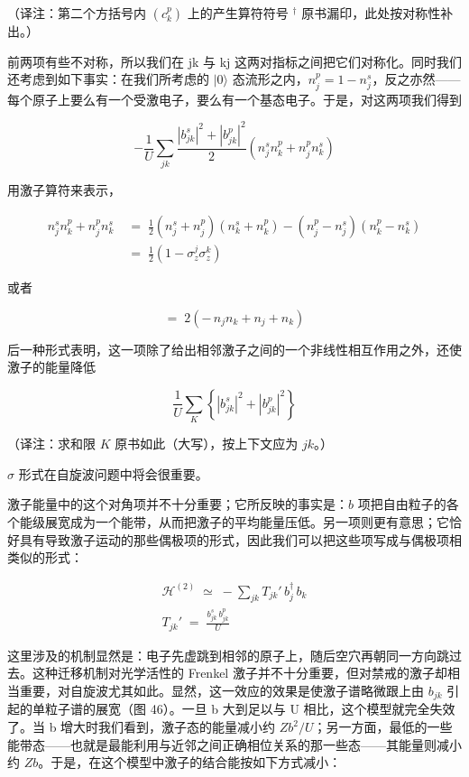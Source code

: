 （译注：第二个方括号内 $\left(c_k^{p}\right)$ 上的产生算符符号 $^{\dagger}$ 原书漏印，此处按对称性补出。）

前两项有些不对称，所以我们在 jk 与 kj 这两对指标之间把它们对称化。同时我们还考虑到如下事实：在我们所考虑的 $|0\rangle$ 态流形之内，$n_j^{p} = 1 - n_j^{s}$，反之亦然——每个原子上要么有一个受激电子，要么有一个基态电子。于是，对这两项我们得到

\begin{equation*}
-\frac{1}{U}\sum_{jk}\frac{|b_{jk}^{s}|^{2} + |b_{jk}^{p}|^{2}}{2}\left(n_j^{s}n_k^{p} + n_j^{p}n_k^{s}\right)
\end{equation*}

用激子算符来表示，

\begin{align*}
n_j^{s}n_k^{p} + n_j^{p}n_k^{s} \;&=\; \frac{1}{2}\left(n_j^{s} + n_j^{p}\right)\left(n_k^{s} + n_k^{p}\right) - \left(n_j^{p} - n_j^{s}\right)\left(n_k^{p} - n_k^{s}\right) \\
&=\; \frac{1}{2}\left(1 - \sigma_z^{j}\sigma_z^{k}\right)
\end{align*}

或者

\begin{equation*}
=\;2\left(-\,n_j n_k + n_j + n_k\right)
\end{equation*}

后一种形式表明，这一项除了给出相邻激子之间的一个非线性相互作用之外，还使激子的能量降低

\begin{equation*}
\frac{1}{U}\sum_{K}\left\{|b_{jk}^{s}|^{2} + |b_{jk}^{p}|^{2}\right\}
\end{equation*}

（译注：求和限 $K$ 原书如此（大写），按上下文应为 $jk$。）

$\sigma$ 形式在自旋波问题中将会很重要。

激子能量中的这个对角项并不十分重要；它所反映的事实是：$b$ 项把自由粒子的各个能级展宽成为一个能带，从而把激子的平均能量压低。另一项则更有意思；它恰好具有导致激子运动的那些偶极项的形式，因此我们可以把这些项写成与偶极项相类似的形式：

\begin{gather*}
\mathcal{H}^{(2)} \;\simeq\; -\sum_{jk} T_{jk}'\,b_j^{\dagger}\,b_k \\
T_{jk}' \;=\; \frac{b_{jk}^{s}\,b_{jk}^{p}}{U} \tag{22}
\end{gather*}

这里涉及的机制显然是：电子先虚跳到相邻的原子上，随后空穴再朝同一方向跳过去。这种迁移机制对光学活性的 Frenkel 激子并不十分重要，但对禁戒的激子却相当重要，对自旋波尤其如此。显然，这一效应的效果是使激子谱略微跟上由 $b_{jk}$ 引起的单粒子谱的展宽（图 46）。一旦 b 大到足以与 U 相比，这个模型就完全失效了。当 b 增大时我们看到，激子态的能量减小约 $Zb^{2}/U$；另一方面，最低的一些能带态——也就是最能利用与近邻之间正确相位关系的那一些态——其能量则减小约 $Zb$。于是，在这个模型中激子的结合能按如下方式减小：

